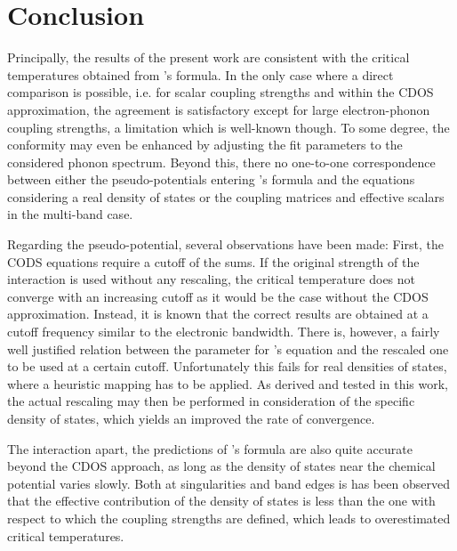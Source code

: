 
\chapter{Conclusion}
\label{conclusion}

Principally, the results of the present work are consistent with the critical
temperatures obtained from 's formula. In the only case where a
direct comparison is possible, i.e. for scalar coupling strengths and within the
CDOS approximation, the agreement is satisfactory except for large
electron-phonon coupling strengths, a limitation which is well-known though. To
some degree, the conformity may even be enhanced by adjusting the fit parameters
to the considered phonon spectrum. Beyond this, there no one-to-one
correspondence between either the  pseudo-potentials entering
's formula and the  equations considering a real
density of states or the coupling matrices and effective scalars in the
multi-band case.

Regarding the  pseudo-potential, several observations have been
made: First, the CODS  equations require a cutoff of the
 sums. If the original strength of the 
interaction is used without any rescaling, the critical temperature does not
converge with an increasing cutoff as it would be the case without the CDOS
approximation. Instead, it is known that the correct results are obtained at a
cutoff frequency similar to the electronic bandwidth. There is, however, a
fairly well justified relation between the parameter for 's
equation and the rescaled one to be used at a certain cutoff. Unfortunately this
fails for real densities of states, where a heuristic mapping has to be applied.
As derived and tested in this work, the actual rescaling may then be performed
in consideration of the specific density of states, which yields an improved the
rate of convergence.

The  interaction apart, the predictions of 's
formula are also quite accurate beyond the CDOS approach, as long as the density
of states near the chemical potential varies slowly. Both at 
singularities and band edges is has been observed that the effective
contribution of the density of states is less than the one with respect to which
the coupling strengths are defined, which leads to overestimated critical
temperatures.

